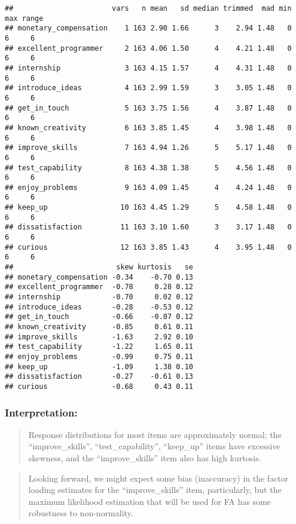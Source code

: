 \documentclass[
]{article}
\begin{document}
\begin{verbatim}
##                       vars   n mean   sd median trimmed  mad min max range
## monetary_compensation    1 163 2.90 1.66      3    2.94 1.48   0   6     6
## excellent_programmer     2 163 4.06 1.50      4    4.21 1.48   0   6     6
## internship               3 163 4.15 1.57      4    4.31 1.48   0   6     6
## introduce_ideas          4 163 2.99 1.59      3    3.05 1.48   0   6     6
## get_in_touch             5 163 3.75 1.56      4    3.87 1.48   0   6     6
## known_creativity         6 163 3.85 1.45      4    3.98 1.48   0   6     6
## improve_skills           7 163 4.94 1.26      5    5.17 1.48   0   6     6
## test_capability          8 163 4.38 1.38      5    4.56 1.48   0   6     6
## enjoy_problems           9 163 4.09 1.45      4    4.24 1.48   0   6     6
## keep_up                 10 163 4.45 1.29      5    4.58 1.48   0   6     6
## dissatisfaction         11 163 3.10 1.60      3    3.17 1.48   0   6     6
## curious                 12 163 3.85 1.43      4    3.95 1.48   0   6     6
##                        skew kurtosis   se
## monetary_compensation -0.34    -0.70 0.13
## excellent_programmer  -0.78     0.28 0.12
## internship            -0.70     0.02 0.12
## introduce_ideas       -0.28    -0.53 0.12
## get_in_touch          -0.66    -0.07 0.12
## known_creativity      -0.85     0.61 0.11
## improve_skills        -1.63     2.92 0.10
## test_capability       -1.22     1.65 0.11
## enjoy_problems        -0.99     0.75 0.11
## keep_up               -1.09     1.38 0.10
## dissatisfaction       -0.27    -0.61 0.13
## curious               -0.68     0.43 0.11
\end{verbatim}

\hypertarget{interpretation}{%
\subsubsection{Interpretation:}\label{interpretation}}

\begin{quote}
Response distributions for most items are approximately normal; the
``improve\_skills'', ``test\_capability'', ``keep\_up'' items have
excessive skewness, and the ``improve\_skills'' item also has high
kurtosis.
\end{quote}

\begin{quote}
Looking forward, we might expect some bias (inaccuracy) in the factor
loading estimates for the ``improve\_skills'' item, particularly, but
the maximum likelihood estimation that will be used for FA has some
robustness to non-normality.
\end{quote}
\end{document}
